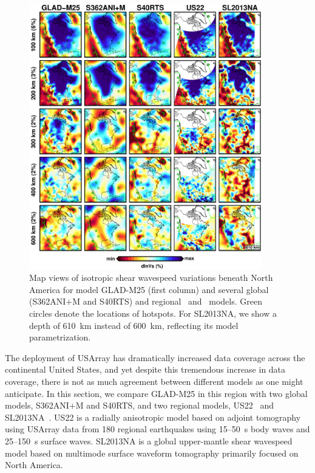 \documentclass[extra,mreferee]{gji}
\begin{document}
\begin{figure}
\centering
\includegraphics[width=0.9\textwidth]{figures/depth_slice/america_vs.pdf}
  \caption{\small{Map views of isotropic shear wavespeed variations beneath North America 
  for model GLAD-M25 (first column) and several global (S362ANI$+$M and S40RTS)
  and regional~\citep[US22;][]{zhu2017radial} and~\citep[SL2013NA;][]{schaeffer2014imaging}
  models. Green circles denote the locations of hotspots. For SL2013NA, we
  show a depth of 610~km instead of 600~km, reflecting its model parametrization.}}
\label{fig:america-vs}
\end{figure}

The deployment of USArray has dramatically increased data coverage across the
continental United States,
and yet despite this tremendous increase in data coverage, there is not as much agreement between different models as one might anticipate.
In this section, we compare GLAD-M25 in this region 
with two global models, S362ANI$+$M and S40RTS, and two regional models,
US22~\citep{zhu2017radial} and SL2013NA~\citep{schaeffer2014imaging}.
US22 is a radially anisotropic model based on adjoint tomography using
USArray data from 180 regional earthquakes using 15--50~s
body waves and 25--150~s surface waves.
SL2013NA is a global upper-mantle shear wavespeed model based on multimode
surface waveform tomography primarily focused on North America.
\end{document}
